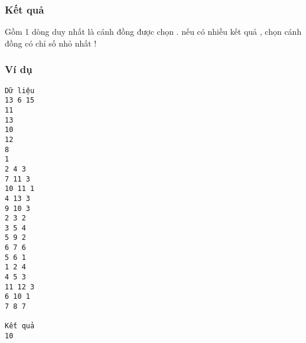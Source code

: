 \subsubsection{   Kết quả  }

   Gồm 1 dòng duy nhất là cánh đồng được chọn . nếu có nhiều kết quả , chọn cánh đồng có chỉ số nhỏ nhất !  

\subsubsection{   Ví dụ  }
\begin{verbatim}
Dữ liệu
13 6 15
11
13
10
12
8
1
2 4 3
7 11 3
10 11 1
4 13 3
9 10 3
2 3 2
3 5 4
5 9 2
6 7 6
5 6 1
1 2 4
4 5 3
11 12 3
6 10 1
7 8 7

Kết quả
10
\end{verbatim}
